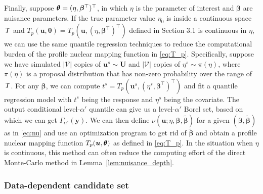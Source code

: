 \documentclass[12pt]{article}
\theoremstyle{shortspace}
\def\*#1{\bm{#1}}
\def\btheta{\mathop{\theta\kern-.45em\hbox{$\theta$}}\nolimits}
\begin{document}
Finally, suppose  $\btheta = (\eta, {\*\beta}^\top)^\top$, in which $\eta$ is the parameter of interest and $\*\beta$ are nuisance parameters. If the true parameter value $\eta_0$ is inside a continuous space ${\it \Upsilon}$ and $T_p(\*u, \*\theta) = T_p(\*u, (\eta, {\*\beta}^\top)^\top)$ defined in Section 3.1 is continuous in $\eta$, we can use the same quantile regression techniques to reduce the computational burden of the profile nuclear mapping function in  \eqref{eq:T_p}. 
Specifically, suppose we have simulated $|{\mathcal V}|$ copies of $\*u^s \sim \*U$ and $|{\mathcal V}|$ copies of $\eta^s \sim \pi(\eta)$, where $\pi(\eta)$ is a proposal distribution that has non-zero probability over the range of ${\it \Upsilon}$. 
For any $\*\beta$, we can compute $t^s = T_p(\*u^s, (\eta^s, {\*\beta}^\top)^\top)$ and fit a quantile regression model with $t^s$ being the response and $\eta^s$ being the covariate. The output conditional level-$\alpha'$ quantile can give us a level-$\alpha'$ Borel set, based on which we can get $\Gamma_{\alpha'}(\*y)$. We can then define $\nu(\*u; \eta, \*\beta, \widetilde {\*\beta})$ for a given $(\*\beta, \widetilde {\*\beta})$ as in \eqref{eq:nu}
and use an optimization program to get rid of $\widetilde {\*\beta}$ and obtain a profile nuclear mapping function $T_p(\*u, \btheta)$ as defined in  \eqref{eq:T_p}. In the situation when $\eta$ is continuous, 
this method can often reduce the computing effort of the direct Monte-Carlo method in Lemma~\ref{lem:nuisance_depth}. 



\subsubsection{Data-dependent candidate set}
\label{sec:data_cand} 
\end{document}
